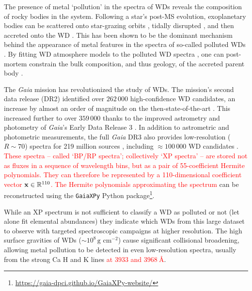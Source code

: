 \documentclass[fleqn,usenatbib]{rasti}
\newcommand\xb{\vb{x}}
\newcommand{\red}[1]{\textcolor{red}{#1}}
\begin{document}
The presence of metal `pollution' in the spectra of WDs reveals the composition of rocky bodies in the system.
Following a star's post-MS evolution, exoplanetary bodies can be scattered onto star-grazing orbits \citep{debes02, bonsor11, frewen14, mustill18, maldonado20dyn, maldonado20und}, tidally disrupted \citep{jura03, veras14}, and then accreted onto the WD \citep{brouwers22}.
This has been shown to be the dominant mechanism behind the appearance of metal features in the spectra of so-called polluted WDs \citep[e.g.,][]{farihi10, veras16}.
By fitting WD atmosphere models to the polluted WD spectra \red{
\citep[e.g.][]{koester05, koester11, dufour07, hollands17, hollands18, blouin18, badenasagusti24}
}, one can post-mortem constrain the bulk composition, and thus geology, of the accreted parent body \citep[e.g.][]{xu21}.

The \textit{Gaia} mission \citep{gaia} has revolutionized the study of WDs.
The mission's second data release (DR2) identified over $262\,000$ high-confidence WD candidates, an increase by almost an order of magnitude on the then-state-of-the-art \citep{gentilefusillo19, gaiadr2}.
This increased further to over $359\,000$ thanks to the improved astrometry and photometry of \textit{Gaia}'s Early Data Release 3 \citep[EDR3;][]{gentilefusillo21, gaiadr3}.
In addition to astrometric and photometric measurements, the full \textit{Gaia} DR3 also provides low-resolution ($R\sim70$) spectra for 219 million sources
\citep{carrasco21, gaiadr3}, including $\approx100\,000$ WD candidates \citep{gentilefusillo21}.
\red{
These spectra -- called `BP/RP spectra'; collectively `XP spectra' -- are stored not as fluxes in a sequence of wavelength bins, but as a pair of 55-coefficient Hermite polynomials.
They can therefore be represented by a 110-dimensional coefficient vector $\xb\in\mathbb{R}^{110}$.
The Hermite polynomials approximating the spectrum
}
can be reconstructed using the \texttt{GaiaXPy} Python package\footnote{
    \url{https://gaia-dpci.github.io/GaiaXPy-website/}
}.

While an XP spectrum is not sufficient to classify a WD as polluted or not (let alone fit elemental abundances) they indicate which WDs from this large dataset to observe with targeted spectroscopic campaigns at higher resolution.
The high surface gravities of WDs ($\sim 10^8\,\text{g cm}^{-2}$) cause significant collisional broadening, allowing metal pollution to be detected in even low-resolution spectra, usually from the strong Ca H and K lines \red{at $3933$ and $3968~\text{\AA}$}.
\end{document}
